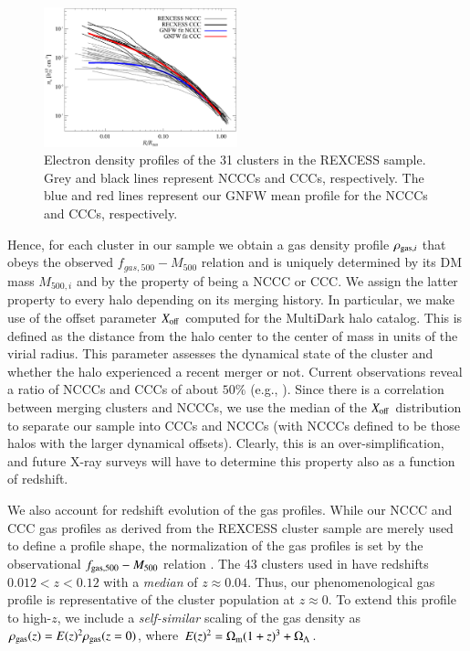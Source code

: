 \documentclass[useAMS,usenatbib]{mn2e}
\begin{document}
\begin{figure} 
\centering
\includegraphics[width=0.5\textwidth]{figures/gas_profiles.eps}
\caption{Electron density profiles of the 31 clusters in the REXCESS sample. Grey and black lines represent NCCCs and CCCs, respectively. The blue and red lines represent our GNFW mean profile for the NCCCs and CCCs, respectively.}
\label{fig:gas_profiles}
\end{figure}

Hence, for each cluster in our sample we obtain a gas density profile
$\rho_{{\mathrm{gas}},i}$ that obeys the observed $f_{gas,500}-M_{500}$ relation and
is uniquely determined by its DM mass $M_{500,i}$ and by the property of being a
NCCC or CCC. We assign the latter property to every halo depending on its
merging history. In particular, we make use of the offset parameter
$X_{{\mathrm{off}}}$ computed for the MultiDark halo catalog. This is defined as the
distance from the halo center to the center of mass in units of the virial
radius. This parameter assesses the dynamical state of the cluster and whether
the halo experienced a recent merger or not. Current observations reveal a ratio
of NCCCs and CCCs of about $50\%$ (e.g., \citealp{2007A&A...466..805C,
  2009MNRAS.395..764S}). Since there is a correlation between merging clusters
and NCCCs, we use the median of the $X_{{\mathrm{off}}}$ distribution to separate our
sample into CCCs and NCCCs (with NCCCs defined to be those halos with the larger
dynamical offsets). Clearly, this is an over-simplification, and future X-ray
surveys will have to determine this property also as a function of redshift.

We also account for redshift evolution of the gas profiles. While our NCCC and
CCC gas profiles as derived from the REXCESS cluster sample are merely used to
define a profile shape, the normalization of the gas profiles is set by the
observational $f_{{\mathrm{gas}},500}-M_{500}$ relation \citep{2009ApJ...693.1142S}.
The 43 clusters used in \cite{2009ApJ...693.1142S} have redshifts $0.012 < z <
0.12$ with a \emph{median} of $z \approx 0.04$. Thus, our phenomenological gas
profile is representative of the cluster population at $z\approx0$. To extend this
profile to high-$z$, we include a \emph{self-similar} scaling of the gas density
as $\rho_{{\mathrm{gas}}}(z) = E(z)^{2} \rho_{{\mathrm{gas}}}(z=0)$, where $E(z)^{2} =
\Omega_{{\mathrm{m}}} (1+z)^{3} + \Omega_{{\Lambda}}$.
\end{document}
